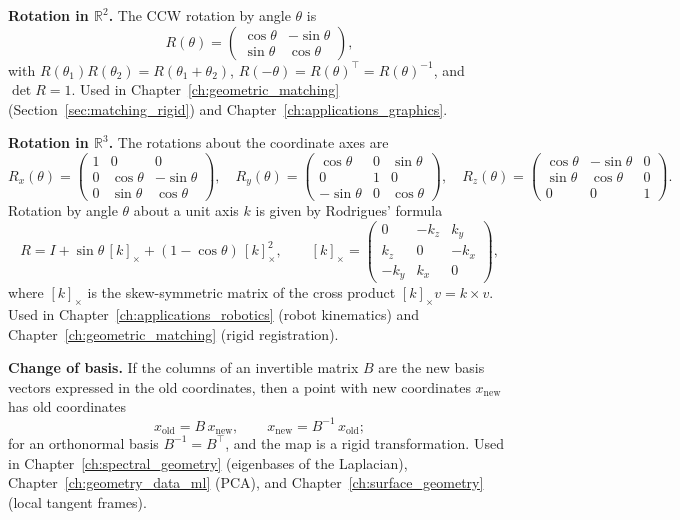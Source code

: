 \medskip\noindent\textbf{Rotation in $\mathbb{R}^2$.}
The CCW rotation by angle $\theta$ is
\[
  R(\theta) = \begin{pmatrix}
    \cos\theta & -\sin\theta\\
    \sin\theta & \cos\theta
  \end{pmatrix},
\]
with $R(\theta_1)R(\theta_2) = R(\theta_1 + \theta_2)$,
$R(-\theta) = R(\theta)^\top = R(\theta)^{-1}$, and $\det R = 1$. Used in
Chapter~\ref{ch:geometric_matching} (Section~\ref{sec:matching_rigid}) and
Chapter~\ref{ch:applications_graphics}.

\medskip\noindent\textbf{Rotation in $\mathbb{R}^3$.}
The rotations about the coordinate axes are
\[
  R_x(\theta) = \begin{pmatrix}
    1 & 0 & 0\\
    0 & \cos\theta & -\sin\theta\\
    0 & \sin\theta & \cos\theta
  \end{pmatrix}, \quad
  R_y(\theta) = \begin{pmatrix}
    \cos\theta & 0 & \sin\theta\\
    0 & 1 & 0\\
    -\sin\theta & 0 & \cos\theta
  \end{pmatrix}, \quad
  R_z(\theta) = \begin{pmatrix}
    \cos\theta & -\sin\theta & 0\\
    \sin\theta & \cos\theta & 0\\
    0 & 0 & 1
  \end{pmatrix}.
\]
Rotation by angle $\theta$ about a unit axis $k$ is given by Rodrigues'
formula
\[
  R = I + \sin\theta\,[k]_\times + (1 - \cos\theta)\,[k]_\times^2,
  \qquad
  [k]_\times = \begin{pmatrix}
    0 & -k_z & k_y\\
    k_z & 0 & -k_x\\
    -k_y & k_x & 0
  \end{pmatrix},
\]
where $[k]_\times$ is the skew-symmetric matrix of the cross product
$[k]_\times v = k\times v$. Used in Chapter~\ref{ch:applications_robotics}
(robot kinematics) and Chapter~\ref{ch:geometric_matching} (rigid
registration).

\medskip\noindent\textbf{Change of basis.}
If the columns of an invertible matrix $B$ are the new basis vectors
expressed in the old coordinates, then a point with new coordinates
$x_{\text{new}}$ has old coordinates
\[
  x_{\text{old}} = B\,x_{\text{new}},
  \qquad
  x_{\text{new}} = B^{-1}\,x_{\text{old}};
\]
for an orthonormal basis $B^{-1} = B^\top$, and the map is a rigid
transformation. Used in Chapter~\ref{ch:spectral_geometry} (eigenbases of
the Laplacian), Chapter~\ref{ch:geometry_data_ml} (PCA), and
Chapter~\ref{ch:surface_geometry} (local tangent frames).

